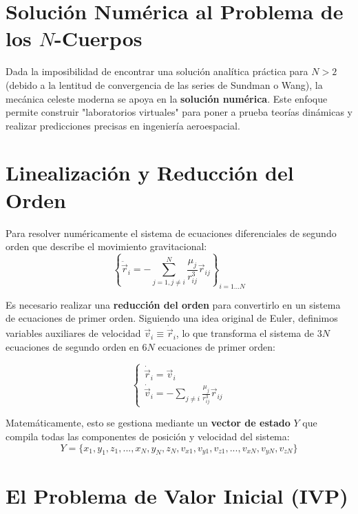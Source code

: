 \documentclass[a4paper]{article}
\begin{document}
\section{Solución Numérica al Problema de los $N$-Cuerpos}

Dada la imposibilidad de encontrar una solución analítica práctica para $N > 2$ (debido a la lentitud de convergencia de las series de Sundman o Wang), la mecánica celeste moderna se apoya en la \textbf{solución numérica}. Este enfoque permite construir "laboratorios virtuales" para poner a prueba teorías dinámicas y realizar predicciones precisas en ingeniería aeroespacial.

\section{Linealización y Reducción del Orden}

Para resolver numéricamente el sistema de ecuaciones diferenciales de segundo orden que describe el movimiento gravitacional:
\begin{equation}
    \left\{ \ddot{\vec{r}}_i = -\sum_{j=1, j \neq i}^{N} \frac{\mu_j}{r_{ij}^3} \vec{r}_{ij} \right\}_{i=1...N}
\end{equation}

Es necesario realizar una \textbf{reducción del orden} para convertirlo en un sistema de ecuaciones de primer orden. Siguiendo una idea original de Euler, definimos variables auxiliares de velocidad $\vec{v}_i \equiv \dot{\vec{r}}_i$, lo que transforma el sistema de $3N$ ecuaciones de segundo orden en $6N$ ecuaciones de primer orden:

\begin{equation}
    \begin{cases} 
    \dot{\vec{r}}_i = \vec{v}_i \\
    \dot{\vec{v}}_i = -\sum_{j \neq i} \frac{\mu_j}{r_{ij}^3} \vec{r}_{ij} 
    \end{cases}
\end{equation}

Matemáticamente, esto se gestiona mediante un \textbf{vector de estado} $Y$ que compila todas las componentes de posición y velocidad del sistema:
\begin{equation}
    Y = \{x_1, y_1, z_1, ..., x_N, y_N, z_N, v_{x1}, v_{y1}, v_{z1}, ..., v_{xN}, v_{yN}, v_{zN}\}
\end{equation}

\section{El Problema de Valor Inicial (IVP)}
\end{document}
